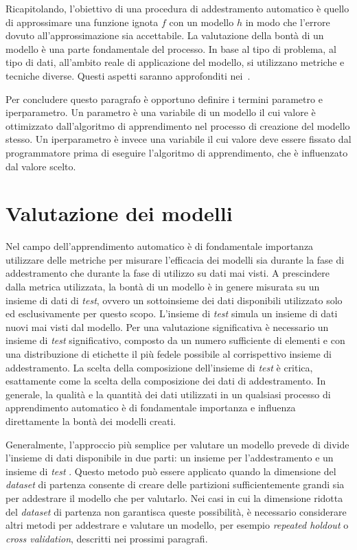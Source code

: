 Ricapitolando, l'obiettivo di una procedura di addestramento automatico è quello di approssimare una funzione ignota $f$ con un modello $h$ in modo che l'errore dovuto all'approssimazione sia accettabile.
La valutazione della bontà di un modello è una parte fondamentale del processo.
In base al tipo di problema, al tipo di dati, all'ambito reale di applicazione del modello, si utilizzano metriche e tecniche diverse.
Questi aspetti saranno approfonditi nei~.

Per concludere questo paragrafo è opportuno definire i termini parametro e iperparametro.
Un parametro è una variabile di un modello il cui valore è ottimizzato dall'algoritmo di apprendimento nel processo di creazione del modello stesso. 
Un iperparametro è invece una variabile il cui valore deve essere fissato dal programmatore prima di eseguire l'algoritmo di apprendimento, che è influenzato dal valore scelto.

\section{Valutazione dei modelli}\label{sec:valutazione_modelli}
Nel campo dell'apprendimento automatico è di fondamentale importanza utilizzare delle metriche per misurare l'efficacia dei modelli sia durante la fase di addestramento che durante la fase di utilizzo su dati mai visti.
A prescindere dalla metrica utilizzata, la bontà di un modello è in genere misurata su un insieme di dati di \emph{test}, ovvero un sottoinsieme dei dati disponibili utilizzato solo ed esclusivamente per questo scopo.
L'insieme di \emph{test} simula un insieme di dati nuovi mai visti dal modello.
Per una valutazione significativa è necessario un insieme di \emph{test} significativo, composto da un numero sufficiente di elementi e con una distribuzione di etichette il più fedele possibile al corrispettivo insieme di addestramento.
La scelta della composizione dell'insieme di \emph{test} è critica, esattamente come la scelta della composizione dei dati di addestramento.
In generale, la qualità e la quantità dei dati utilizzati in un qualsiasi processo di apprendimento automatico è di fondamentale importanza e influenza direttamente la bontà dei modelli creati.

Generalmente, l'approccio più semplice per valutare un modello prevede di divide l'insieme di dati disponibile in due parti: un insieme per l'addestramento e un insieme di \emph{test} . 
Questo metodo può essere applicato quando la dimensione del \emph{dataset} di partenza consente di creare delle partizioni sufficientemente grandi sia per addestrare il modello che per valutarlo.
Nei casi in cui la dimensione ridotta del \emph{dataset} di partenza non garantisca queste possibilità, è necessario considerare altri metodi per addestrare e valutare un modello, per esempio \emph{repeated holdout} o \emph{cross validation}, descritti nei prossimi paragrafi.


